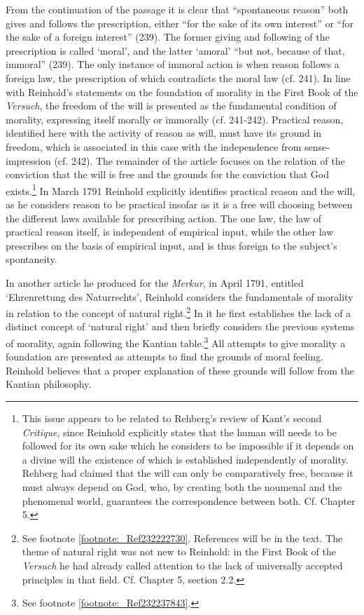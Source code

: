 From the continuation of the passage it is clear that ``spontaneous reason'' both gives and follows the prescription, either ``for the sake of its own interest'' or ``for the sake of a foreign interest'' (239). The former giving and following of the prescription is called `moral', and the latter `amoral' ``but not, because of that, immoral'' (239). The only instance of immoral action is when reason follows a foreign law, the prescription of which contradicts the moral law (cf. 241). In line with Reinhold's statements on the foundation of morality in the First Book of the \textit{Versuch}, the freedom of the will is presented as the fundamental condition of morality, expressing itself morally or immorally (cf. 241{-}242). Practical reason, identified here with the activity of reason as will, must have its ground in freedom, which is associated in this case with the independence from sense{-}impression (cf. 242). The remainder of the article focuses on the relation of the conviction that the will is free and the grounds for the conviction that God exists.\footnote{ This issue appears to be related to Rehberg's review of Kant's second \textit{Critique}, since Reinhold explicitly states that the human will needs to be followed for its own sake which he considers to be impossible if it depends on a divine will the existence of which is established independently of morality. Rehberg had claimed that the will can only be comparatively free, because it must always depend on God, who, by creating both the noumenal and the phenomenal world, guarantees the correspondence between both. Cf. Chapter 5. } In March 1791 Reinhold explicitly identifies practical reason and the will, as he considers reason to be practical insofar as it is a free will choosing between the different laws available for prescribing action. The one law, the law of practical reason itself, is independent of empirical input, while the other law prescribes on the basis of empirical input, and is thus foreign to the subject's spontaneity. 

 In another article he produced for the \textit{Merkur}, in April 1791, entitled `Ehrenrettung des Naturrechts', Reinhold considers the fundamentals of morality in relation to the concept of natural right.\footnote{ See footnote \ref{footnote:_Ref232222730}. References will be in the text. The theme of natural right was not new to Reinhold: in the First Book of the \textit{Versuch} he had already called attention to the lack of universally accepted principles in that field. Cf. Chapter 5, section 2.2. } In it he first establishes the lack of a distinct concept of `natural right' and then briefly considers the previous systems of morality, again following the Kantian table.\footnote{ See footnote \ref{footnote:_Ref232237843}.} All attempts to give morality a foundation are presented as attempts to find the grounds of moral feeling. Reinhold believes that a proper explanation of these grounds will follow from the Kantian philosophy. 

